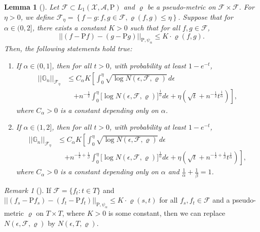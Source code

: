 \documentclass[ejsv2,noshowframe]{imsart}
\theoremstyle{plain}
\newtheorem{lemma}[theorem]{Lemma}
\theoremstyle{definition}
\theoremstyle{remark}
\newtheorem{remark}{Remark}
\newcommand{\norm}[1]{\left|\left| #1 \right|\right|}
\begin{document}
\vspace{3mm}

\begin{lemma}[\citealt{giessing2022inequalities}]
	\label{lem:empirical_bound}
	Let $\mathcal{F} \subset L_1(\mathcal{X},\mathcal{A},\mathrm{P})$ and $\varrho$ be a pseudo-metric on $\mathcal{F}\times \mathcal{F}$. For $\eta >0$, we define $\mathcal{F}_{\eta}=\left\{f-g: f,g \in \mathcal{F},\varrho(f,g) \leq \eta \right\}$. Suppose that for $\alpha\in (0,2]$, there exists a constant $K>0$ such that for all $f,g\in \mathcal{F}$,
	$$\norm{\left(f-\mathrm{P}f\right) -\left(g-\mathrm{P} g\right)}_{\mathrm{P},\psi_{\alpha}} \leq K \cdot \varrho(f,g).$$
	Then, the following statements hold true:
	\begin{enumerate}[label=(\alph*)]
		\item If $\alpha \in (0,1]$, then for all $t>0$, with probability at least $1-e^{-t}$,
		\begin{align*}
			\norm{\mathbb{G}_n}_{\mathcal{F}_{\eta}} &\leq C_{\alpha} K\left[\int_0^{\eta} \sqrt{\log N(\epsilon,\mathcal{F},\varrho)} \, d\epsilon \right.\\
			&\quad \left.+ n^{-\frac{1}{2}} \int_0^{\eta} \big[\log N(\epsilon,\mathcal{F},\varrho) \big]^{\frac{1}{\alpha}} d\epsilon + \eta\left(\sqrt{t} + n^{-\frac{1}{2}} t^{\frac{1}{\alpha}} \right)\right],
		\end{align*}
		where $C_{\alpha} >0$ is a constant depending only on $\alpha$.
		
		\item If $\alpha \in (1,2]$, then for all $t>0$, with probability at least $1-e^{-t}$,
		\begin{align*}
			\norm{\mathbb{G}_n}_{\mathcal{F}_{\eta}} &\leq C_{\alpha} K\left[\int_0^{\eta} \sqrt{\log N(\epsilon,\mathcal{F},\varrho)} \, d\epsilon  \right.\\
			&\quad \left. + n^{-\frac{1}{2}+\frac{1}{\beta}} \int_0^{\eta} \big[\log N(\epsilon,\mathcal{F},\varrho) \big]^{\frac{1}{\alpha}} d\epsilon + \eta\left(\sqrt{t} + n^{-\frac{1}{2}+\frac{1}{\beta}} t^{\frac{1}{\alpha}} \right)\right],
		\end{align*}
		where $C_{\alpha} >0$ is a constant depending only on $\alpha$ and $\frac{1}{\alpha}+\frac{1}{\beta}=1$.
	\end{enumerate}
\end{lemma}

\begin{remark}[\citealt{giessing2021inference}]
	\label{remark:index_class}
	If $\mathcal{F}=\{f_t:t\in T\}$ and $\norm{\left(f_s-\mathrm{P} f_s\right) - \left(f_t -\mathrm{P}f_t\right)}_{\mathrm{P},\psi_{\alpha}} \leq K\cdot \varrho(s,t)$ for all $f_s,f_t\in \mathcal{F}$ and a pseudo-metric $\varrho$ on $T\times T$, where $K>0$ is some constant, then we can replace $N(\epsilon,\mathcal{F},\varrho)$ by $N(\epsilon,T,\varrho)$.
\end{remark}
\end{document}
